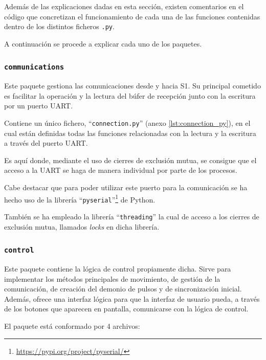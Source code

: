 Además de las explicaciones dadas en esta sección, existen comentarios en el código que concretizan el funcionamiento de cada una de las funciones contenidas dentro de los distintos ficheros \texttt{.py}.

A continuación se procede a explicar cada uno de los paquetes.

\subsubsection{\texttt{communications}}
Este paquete gestiona las comunicaciones desde y hacia \ac{S1}. Su principal cometido es facilitar la operación y la lectura del búfer de recepción junto con la escritura por un puerto UART.

Contiene un único fichero, ``\texttt{connection.py}'' (anexo \ref{lst:connection_py}), en el cual están definidas todas las funciones relacionadas con la lectura y la escritura a través del puerto UART.

Es aquí donde, mediante el uso de cierres de exclusión mutua, se consigue que el acceso a la UART se haga de manera individual por parte de los procesos.

Cabe destacar que para poder utilizar este puerto para la comunicación se ha hecho uso de la librería ``\texttt{pyserial}''\footnote{\url{https://pypi.org/project/pyserial/}} de Python.

También se ha empleado la librería ``\texttt{threading}'' la cual de acceso a los cierres de exclusión mutua, llamados \textit{locks} en dicha librería.

\subsubsection{\texttt{control}}

Este paquete contiene la lógica de control propiamente dicha. Sirve para implementar los métodos principales de movimiento, de gestión de la comunicación, de creación del demonio de pulsos y de  sincronización inicial. Además, ofrece una interfaz lógica para que la interfaz de usuario pueda, a través de los botones que aparecen en pantalla, comunicarse con la lógica de control.

El paquete está conformado por 4 archivos:

